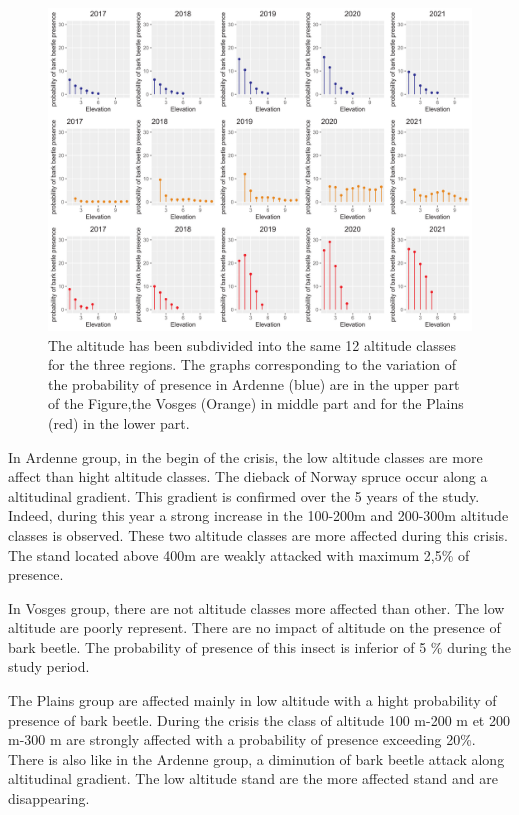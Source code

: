 \documentclass[3p,procedia]{elsarticle}
\begin{document}
\begin{figure}[htbp] 
\centering
	\includegraphics[width=\textwidth]{synthese_color_06_2022.png}
     \caption{The altitude has been subdivided into the same 12 altitude classes for the three regions. 
The graphs corresponding to the variation of the probability of presence in Ardenne (blue) are in the upper part of the Figure,the Vosges (Orange) in middle part and for the Plains (red) in the lower part.
}
	\label{alti_sco}
\end{figure}

In Ardenne group, in the begin of the crisis, the low altitude classes are more affect than hight altitude classes.
The dieback of Norway spruce occur along a altitudinal  gradient.
This gradient is confirmed over the 5 years of the study.
Indeed, during this year a strong increase in the 100-200m and 200-300m altitude classes is observed. 
These two altitude classes are more affected during this crisis.
The stand located above 400m are weakly attacked with maximum 2,5\% of presence.

In Vosges group, there are not altitude classes more affected than other. 
The low altitude are poorly represent. There are no impact of altitude on the presence of bark beetle. 
The probability of presence of this insect is inferior of 5 \% during the study period.

The Plains group are affected mainly in low altitude with a hight probability of presence of bark beetle. 
During the crisis the class of altitude 100 m-200 m et 200 m-300 m are strongly affected with a probability of presence exceeding 20\%.
There is also like in the Ardenne group, a diminution of bark beetle attack along altitudinal gradient.
The low altitude stand are the more affected stand and are disappearing.
\end{document}
